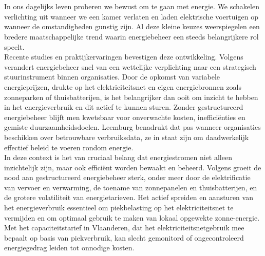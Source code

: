 
\chapter{}%
\label{ch:inleiding}

\noindent
In ons dagelijks leven proberen we bewust om te gaan met energie. We schakelen verlichting uit wanneer we een kamer verlaten en laden elektrische voertuigen op wanneer de omstandigheden gunstig zijn. Al deze kleine keuzes weerspiegelen een bredere maatschappelijke trend waarin energiebeheer een steeds belangrijkere rol speelt. \\

Recente studies en praktijkervaringen bevestigen deze ontwikkeling. Volgens \autocite{Leemburg2025} verandert energiebeheer snel van een wettelijke verplichting naar een strategisch stuurinstrument binnen organisaties. Door de opkomst van variabele energieprijzen, drukte op het elektriciteitsnet en eigen energiebronnen zoals zonneparken of thuisbatterijen, is het belangrijker dan ooit om inzicht te hebben in het energieverbruik en dit actief te kunnen sturen. Zonder gestructureerd energiebeheer blijft men kwetsbaar voor onverwachte kosten, inefficiënties en gemiste duurzaamheidsdoelen. Leemburg benadrukt dat pas wanneer organisaties beschikken over betrouwbare verbruiksdata, ze in staat zijn om daadwerkelijk effectief beleid te voeren rondom energie.\\

\noindent
In deze context is het van cruciaal belang dat energiestromen niet alleen inzichtelijk zijn, maar ook efficiënt worden bewaakt en beheerd. Volgens \textcite{Selleslagh2024} groeit de nood aan gestructureerd energiebeheer sterk, onder meer door de elektrificatie van vervoer en verwarming, de toename van zonnepanelen en thuisbatterijen, en de grotere volatiliteit van energietarieven. 
Het actief spreiden en aansturen van het energieverbruik essentieel om piekbelasting op het elektriciteitsnet te vermijden en om optimaal gebruik te maken van lokaal opgewekte zonne-energie. Met het capaciteitstarief in Vlaanderen, dat het elektriciteitsnetgebruik mee bepaalt op basis van piekverbruik, kan slecht gemonitord of ongecontroleerd energiegedrag leiden tot onnodige kosten. \\

